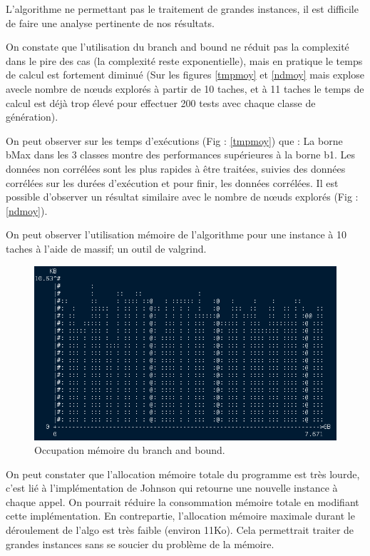 \documentclass[12pt]{article}
\begin{document}
L'algorithme ne permettant pas le traitement de grandes instances, il est difficile de faire une analyse pertinente de nos résultats.

On constate que l'utilisation du branch and bound ne réduit pas la complexité dans le pire des cas (la complexité reste exponentielle), mais en pratique le temps de calcul est fortement diminué (Sur les figures \ref{tmpmoy} et \ref{ndmoy} mais explose avecle nombre de nœuds explorés à partir de 10 taches, et à 11 taches le temps de calcul est déjà trop élevé pour effectuer 200 tests avec chaque classe de génération).


On peut observer sur les temps d'exécutions (Fig : \ref{tmpmoy}) que :
La borne bMax dans les 3 classes montre des performances supérieures à la borne b1.
Les données non corrélées sont les plus rapides à être traitées, suivies des données corrélées sur les durées d'exécution et pour finir, les données corrélées. Il est possible d'observer un résultat similaire avec le nombre de nœuds explorés (Fig : \ref{ndmoy}).

On peut observer l'utilisation mémoire de l'algorithme pour une instance à 10 taches à l'aide de massif; un outil de valgrind.

\begin{figure}[!ht]
\centering
\centerline{\includegraphics[scale=0.6]{mem.png}}
\caption{Occupation mémoire du branch and bound.}
\label{mem}
\end{figure}

On peut constater que l'allocation mémoire totale du programme est très lourde, c'est lié à l'implémentation de Johnson qui retourne une nouvelle instance à chaque appel. On pourrait réduire la consommation mémoire totale en modifiant cette implémentation. En contrepartie, l'allocation mémoire maximale durant le déroulement de l'algo est très faible (environ 11Ko). Cela permettrait traiter de grandes instances sans se soucier du problème de la mémoire.
\end{document}
